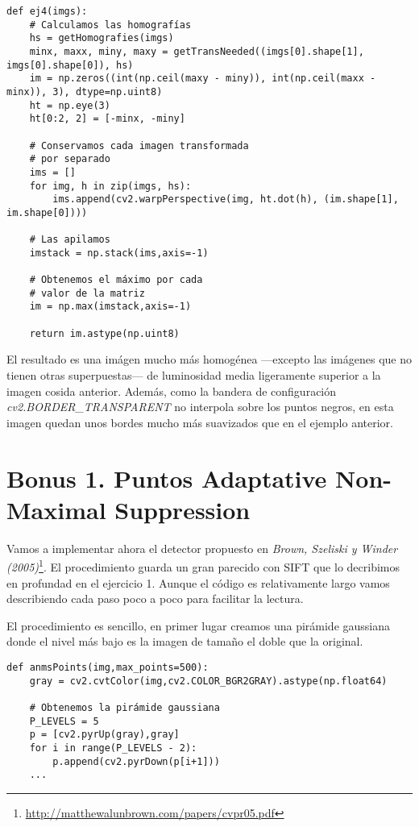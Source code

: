 \documentclass{article}
\newcommand{\img}[2]{
\noindent\makebox[\textwidth][c]{\texttt{[image: \#1]}}%
}
\begin{document}
\begin{lstlisting}
def ej4(imgs):
    # Calculamos las homografías
    hs = getHomografies(imgs)
    minx, maxx, miny, maxy = getTransNeeded((imgs[0].shape[1], imgs[0].shape[0]), hs)
    im = np.zeros((int(np.ceil(maxy - miny)), int(np.ceil(maxx - minx)), 3), dtype=np.uint8)
    ht = np.eye(3)
    ht[0:2, 2] = [-minx, -miny]
	
	# Conservamos cada imagen transformada
	# por separado
    ims = []
    for img, h in zip(imgs, hs):
        ims.append(cv2.warpPerspective(img, ht.dot(h), (im.shape[1], im.shape[0])))
	
	# Las apilamos 
    imstack = np.stack(ims,axis=-1)

    # Obtenemos el máximo por cada
    # valor de la matriz
    im = np.max(imstack,axis=-1)
    
    return im.astype(np.uint8)
\end{lstlisting}

El resultado es una imágen mucho más homogénea ---excepto las imágenes que no tienen otras superpuestas--- de luminosidad media ligeramente superior a la imagen cosida anterior. Además, como la bandera de configuración \textit{cv2.BORDER\_TRANSPARENT} no interpola sobre los puntos negros, en esta imagen quedan unos bordes mucho más suavizados que en el ejemplo anterior.

\img{img/ej4_2}{1}

\section{Bonus 1. Puntos Adaptative Non-Maximal Suppression}

Vamos a implementar ahora el detector propuesto en \textit{Brown, Szeliski y Winder (2005)}\footnote{\url{http://matthewalunbrown.com/papers/cvpr05.pdf}}. El procedimiento guarda un gran parecido con SIFT que lo decribimos en profundad en el ejercicio 1. Aunque el código es relativamente largo vamos describiendo cada paso poco a poco para facilitar la lectura.

El procedimiento es sencillo, en primer lugar creamos una pirámide gaussiana donde el nivel más bajo es la imagen de tamaño el doble que la original.

\begin{lstlisting}
def anmsPoints(img,max_points=500):
    gray = cv2.cvtColor(img,cv2.COLOR_BGR2GRAY).astype(np.float64)

    # Obtenemos la pirámide gaussiana
    P_LEVELS = 5
    p = [cv2.pyrUp(gray),gray]
    for i in range(P_LEVELS - 2):
        p.append(cv2.pyrDown(p[i+1]))
    ...
\end{lstlisting}
\end{document}
